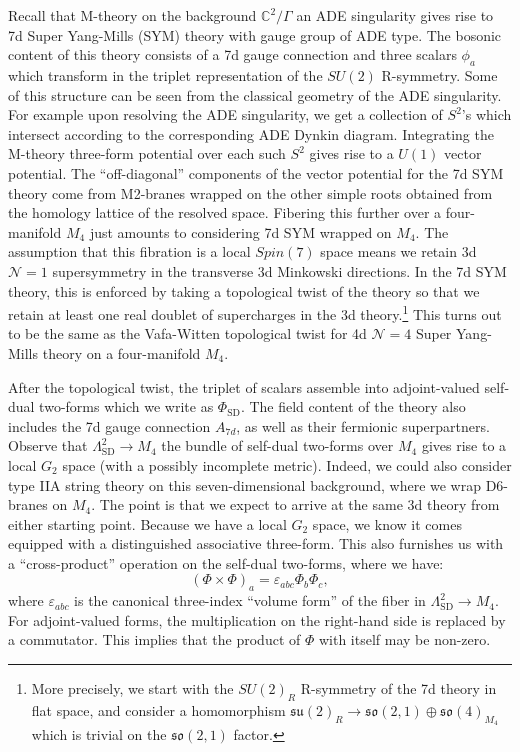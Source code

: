 \documentclass[12pt]{article}%
\numberwithin{equation}{section}
\renewcommand{\(}{\left(}
\renewcommand{\)}{\right)}
\renewcommand{\[}{\left[}
\renewcommand{\]}{\right]}
\begin{document}
Recall that M-theory on the background $\mathbb{C}^2 / \Gamma$ an ADE singularity gives
rise to 7d Super Yang-Mills (SYM) theory with gauge group of ADE type. The bosonic content of this theory consists of a 7d gauge connection and three scalars $\phi_a$ which transform in the triplet representation of the $SU(2)$ R-symmetry. Some of this structure can be seen from the classical geometry of the ADE singularity. For example upon resolving the ADE singularity, we get a collection of $S^2$'s which intersect according to the corresponding ADE Dynkin diagram. Integrating the M-theory three-form potential over each such $S^2$ gives rise to a $U(1)$ vector potential. The ``off-diagonal'' components of the vector potential for the 7d SYM theory come from M2-branes wrapped on the other simple roots obtained from the homology lattice of the resolved space. Fibering this further over a four-manifold $M_4$ just amounts to considering 7d SYM wrapped on $M_4$. The assumption that this fibration is a local $Spin(7)$ space means we retain 3d $\mathcal{N} = 1$ supersymmetry in the transverse 3d Minkowski directions. In the 7d SYM theory, this is enforced by taking a topological twist of the theory so that we retain at least one real doublet of supercharges in the 3d theory.\footnote{More precisely, we start with the $SU(2)_R$ R-symmetry of the 7d theory in flat space, and consider a homomorphism $\mathfrak{su}(2)_R \rightarrow \mathfrak{so}(2,1) \oplus \mathfrak{so}(4)_{M_4}$ which is trivial on the $\mathfrak{so}(2,1)$ factor.} This turns out to be the same as the Vafa-Witten topological twist \cite{Vafa:1994tf} for 4d $\mathcal{N }=4$ Super Yang-Mills theory on a four-manifold $M_4$.

After the topological twist, the triplet of scalars assemble into adjoint-valued self-dual two-forms which we write as $\Phi_{\mathrm{SD}}$. The field content of the theory also includes the 7d gauge connection $A_{7d}$, as well as their fermionic superpartners. Observe that $\Lambda^{2}_{\mathrm{SD}} \rightarrow M_4$ the bundle of self-dual two-forms over $M_4$ gives rise to a local $G_2$ space (with a possibly incomplete metric). Indeed, we could also consider type IIA string theory on this seven-dimensional background, where we wrap D6-branes on $M_4$. The point is that we expect to arrive at the same 3d theory from either starting point. Because we have a local $G_2$ space, we know it comes equipped with a distinguished associative three-form. This also furnishes us with a ``cross-product'' operation on the self-dual two-forms, where we have:
\begin{equation}\label{CROSS}
(\Phi \times \Phi)_{a} = \varepsilon_{abc} \Phi_{b} \Phi_{c},
\end{equation}
where $\varepsilon_{abc}$ is the canonical three-index ``volume form'' of the fiber in $\Lambda^{2}_{\mathrm{SD}} \rightarrow M_4$. For adjoint-valued forms, the multiplication on the right-hand side is replaced by a commutator. This implies that the product of $\Phi$ with itself may be non-zero.
\end{document}
